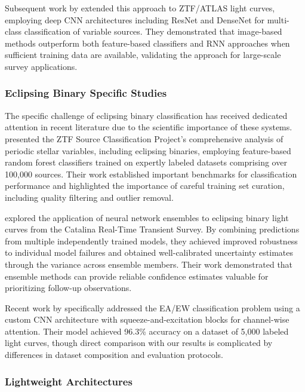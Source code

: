 \documentclass[11pt,a4paper]{article}
\begin{document}
Subsequent work by \citet{chen2020photometric} extended this approach to ZTF/ATLAS light curves, employing deep CNN architectures including ResNet and DenseNet for multi-class classification of variable sources. They demonstrated that image-based methods outperform both feature-based classifiers and RNN approaches when sufficient training data are available, validating the approach for large-scale survey applications.

\subsubsection{Eclipsing Binary Specific Studies}

The specific challenge of eclipsing binary classification has received dedicated attention in recent literature due to the scientific importance of these systems. \citet{aleo2023ztf} presented the ZTF Source Classification Project's comprehensive analysis of periodic stellar variables, including eclipsing binaries, employing feature-based random forest classifiers trained on expertly labeled datasets comprising over 100,000 sources. Their work established important benchmarks for classification performance and highlighted the importance of careful training set curation, including quality filtering and outlier removal.

\citet{heinze2021machine} explored the application of neural network ensembles to eclipsing binary light curves from the Catalina Real-Time Transient Survey. By combining predictions from multiple independently trained models, they achieved improved robustness to individual model failures and obtained well-calibrated uncertainty estimates through the variance across ensemble members. Their work demonstrated that ensemble methods can provide reliable confidence estimates valuable for prioritizing follow-up observations.

Recent work by \citet{torres2021deep} specifically addressed the EA/EW classification problem using a custom CNN architecture with squeeze-and-excitation blocks for channel-wise attention. Their model achieved 96.3\% accuracy on a dataset of 5,000 labeled light curves, though direct comparison with our results is complicated by differences in dataset composition and evaluation protocols.

\subsubsection{Lightweight Architectures}
\end{document}

